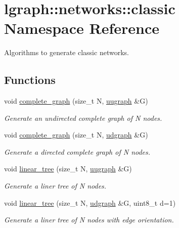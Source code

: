 \hypertarget{namespacelgraph_1_1networks_1_1classic}{\section{lgraph\-:\-:networks\-:\-:classic Namespace Reference}
\label{namespacelgraph_1_1networks_1_1classic}
}


Algorithms to generate classic networks.  


\subsection*{Functions}
\begin{DoxyCompactItemize}
\item 
void \hyperlink{namespacelgraph_1_1networks_1_1classic_a1e4b680e58568ec361b80de0b06c07f1}{complete\-\_\-graph} (size\-\_\-t N, \hyperlink{classlgraph_1_1uugraph}{uugraph} \&G)
\begin{DoxyCompactList}\small\item\em Generate an undirected complete graph of {\itshape N} nodes. \end{DoxyCompactList}\item 
void \hyperlink{namespacelgraph_1_1networks_1_1classic_ad5c4b95c958be073656dc61776313919}{complete\-\_\-graph} (size\-\_\-t N, \hyperlink{classlgraph_1_1udgraph}{udgraph} \&G)
\begin{DoxyCompactList}\small\item\em Generate a directed complete graph of {\itshape N} nodes. \end{DoxyCompactList}\item 
void \hyperlink{namespacelgraph_1_1networks_1_1classic_a0f97ac0554fd9bd03e7618d857f136de}{linear\-\_\-tree} (size\-\_\-t N, \hyperlink{classlgraph_1_1uugraph}{uugraph} \&G)
\begin{DoxyCompactList}\small\item\em Generate a liner tree of {\itshape N} nodes. \end{DoxyCompactList}\item 
void \hyperlink{namespacelgraph_1_1networks_1_1classic_a207a73a90be34953bbffce096fd09ad6}{linear\-\_\-tree} (size\-\_\-t N, \hyperlink{classlgraph_1_1udgraph}{udgraph} \&G, uint8\-\_\-t d=1)
\begin{DoxyCompactList}\small\item\em Generate a liner tree of {\itshape N} nodes with edge orientation. \end{DoxyCompactList}\item 

\end{DoxyCompactItemize}
